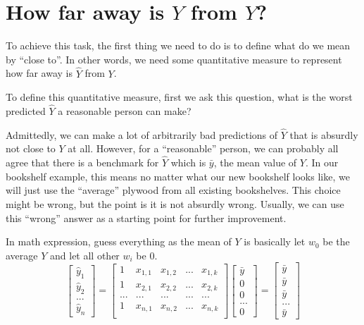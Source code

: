 \documentclass[
	letterpaper
]{article}
\begin{document}
\section{How far away is $\hat Y$ from $Y$?}
To achieve this task, the first thing we need to do is to define what do we mean by ``close to''.
In other words, we need some quantitative measure to represent how far away is $\hat Y$ from $Y$.

To define this quantitative measure, first we ask this question, what is the worst predicted $\hat Y$ a reasonable person can make?

Admittedly, we can make a lot of arbitrarily bad predictions of $\hat Y$ that is absurdly not close to $Y$ at all.
However, for a ``reasonable'' person, we can probably all agree that there is a benchmark for $\hat Y$ which is $\bar y$, the mean value of $Y$.
In our bookshelf example, this means no matter what our new bookshelf looks like, we will just use the ``average'' plywood from all existing bookshelves.
This choice might be wrong, but the point is it is not absurdly wrong.
Usually, we can use this ``wrong'' answer as a starting point for further improvement.

In math expression, guess everything as the mean of $Y$ is basically let $w_0$ be the average $Y$ and let all other $w_i$ be 0.
\begin{equation}
\begin{bmatrix}\hat y_1 \\ \hat y_2 \\ ... \\ \hat y_n\end{bmatrix}
 = \begin{bmatrix}
1 & x_{1, 1} & x_{1, 2} & ... & x_{1, k} \\
1 & x_{2, 1} & x_{2, 2} & ... & x_{2, k} \\
... & ... & ... & ... & ... \\
1 & x_{n, 1} & x_{n, 2} & ... & x_{n, k} \\
\end{bmatrix}
\begin{bmatrix} \bar y \\ 0 \\  0 \\ ... \\ 0\end{bmatrix}
=
\begin{bmatrix} \bar y \\ \bar y \\ \bar y \\ ... \\ \bar y\end{bmatrix}
\end{equation}
\end{document}
